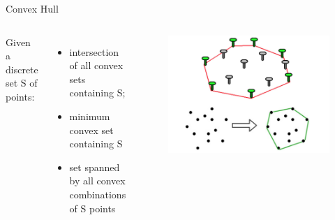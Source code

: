 \begin{frame}{Convex Hull}
    \begin{columns}
            Given a discrete set S of points:
            \begin{itemize}
                \item intersection of all convex sets containing S;
                \item minimum convex set containing S
                \item set spanned by all convex combinations of S points
            \end{itemize}
        \begin{figure}
            \centering
            \includegraphics[width=\textwidth]{figs/L14-convex-hull.jpg}
        \end{figure}
    \end{columns}
\end{frame}


